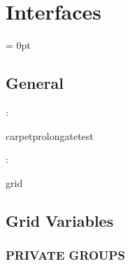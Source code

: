 
\section{Interfaces} 


\parskip = 0pt

\vspace{3mm} \subsection*{General}

: 

carpetprolongatetest
\vspace{2mm}

: 

grid
\vspace{2mm}
\subsection*{Grid Variables}
\vspace{5mm}\subsubsection{PRIVATE GROUPS}

\vspace{5mm}

